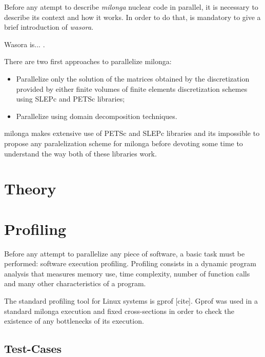 \documentclass[review]{elsarticle}
\begin{document}

Before any atempt to describe \textit{milonga} nuclear code in parallel, it is
necessary to describe its context and how it works. In order to do that, is mandatory
to give a brief introduction of \textit{wasora}.

Wasora is... \cite{wasora}.

There are two first approaches to parallelize milonga:
\begin{itemize}
\item Parallelize only the solution of the matrices obtained by the discretization
  provided by either finite volumes of finite elements discretization schemes using
  SLEPc and PETSc libraries;
\item Parallelize using domain decomposition techniques.
\end{itemize}

milonga makes extensive use of PETSc \cite{petsc} and SLEPc \cite{Hernandez2005} libraries and
its impossible to propose any paralelization scheme for milonga before devoting some
time to understand the way both of these libraries work.

\section{Theory}

\section{Profiling}
Before any attempt to parallelize any piece of software, a basic task must be performed:
software execution profiling. Profiling consists in a dynamic program analysis
that measures memory use, time complexity, number of function calls and many other characteristics of
a program.

The standard profiling tool for Linux systems is gprof [cite]. Gprof was used in a standard milonga
execution
and fixed cross-sections in order to check
the existence of any bottlenecks of its execution.

\subsection{Test-Cases}
\end{document}
